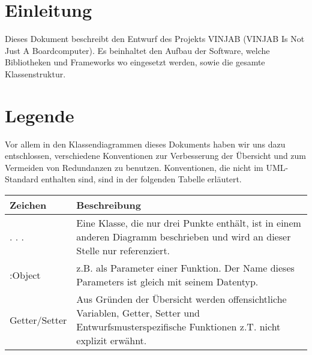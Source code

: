 \documentclass[entwurf.tex]{subfiles}
\begin{document}
\section{Einleitung}
Dieses Dokument beschreibt den Entwurf des Projekts VINJAB (VINJAB Is Not Just A Boardcomputer). Es beinhaltet den Aufbau der Software, welche Bibliotheken und Frameworks wo eingesetzt werden, sowie die gesamte Klassenstruktur.

\section{Legende}
Vor allem in den Klassendiagrammen dieses Dokuments haben wir uns dazu entschlossen, verschiedene Konventionen zur Verbesserung der Übersicht und zum Vermeiden von Redundanzen zu benutzen. Konventionen, die nicht im UML-Standard enthalten sind, sind in der folgenden Tabelle erläutert.

\begin{tabularx}{\textwidth}{ l|X }
	Zeichen	& Beschreibung\\
	\hline
	. . .	& Eine Klasse, die nur drei Punkte enthält, ist in einem anderen Diagramm beschrieben und wird an dieser Stelle nur referenziert.\\
	:Object	& z.B. als Parameter einer Funktion. Der Name dieses Parameters ist gleich mit seinem Datentyp.\\
	Getter/Setter & Aus Gründen der Übersicht werden offensichtliche Variablen, Getter, Setter und Entwurfsmusterspezifische Funktionen z.T.  nicht explizit erwähnt.
\end{tabularx}
\end{document}
